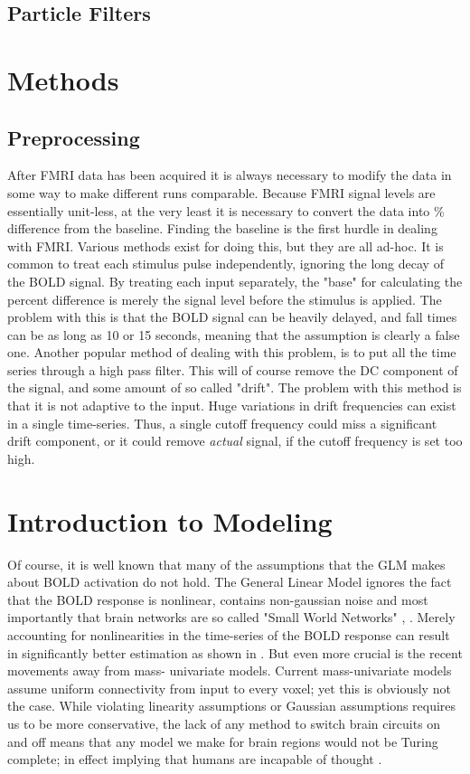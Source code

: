 \documentclass{article}
\begin{document}
\subsection{Particle Filters}

\section*{Methods}
\subsection*{Preprocessing}
After FMRI data has been acquired it is always necessary to modify the
data in some way to make different runs comparable. Because FMRI signal
levels are essentially unit-less, at the very least it is necessary to convert
the data into \% difference from the baseline. Finding the baseline is the
first hurdle in dealing with FMRI. Various methods exist for doing this,
but they are all ad-hoc. It is common to treat each stimulus pulse independently,
ignoring the long decay of the BOLD signal. By treating each input separately,
the "base" for calculating the percent difference is merely the signal level 
before the stimulus is applied. The problem with this is that the BOLD signal
can be heavily delayed, and fall times can be as long as 10 or 15 seconds,
meaning that the assumption is clearly a false one. Another popular method 
of dealing with this problem, is to put all the time series through a high
pass filter. This will of course remove the DC component of the signal, and 
some amount of so called "drift". The problem with this method is that it is
not adaptive to the input. Huge variations in drift frequencies can exist 
in a single time-series. Thus, a single cutoff frequency could miss a significant
drift component, or it could remove \emph{actual} signal, if the cutoff frequency is
set too high. 


\section*{Introduction to Modeling}

Of course, it is well known that many of the assumptions 
that the GLM makes about BOLD activation do not hold. 
The General Linear Model ignores
the fact that the BOLD response is nonlinear, contains non-gaussian
noise and most importantly that brain networks are 
so called "Small World Networks" \citep{smallworld}, \citep{noise}. 
Merely accounting for
nonlinearities in the time-series of the BOLD response can
result in significantly better estimation as shown in \citep{nonlinearmodels}.
But even more crucial is the recent movements away from mass-
univariate models. Current mass-univariate models 
assume uniform connectivity from input to every voxel; yet
this is obviously not the case. While
violating linearity assumptions or Gaussian assumptions 
requires us to be more conservative, the lack of any method
to switch brain circuits on and off means that any model
we make for brain regions would not be Turing complete;
in effect implying that humans are incapable of 
thought \citep{turing}.
\end{document}
